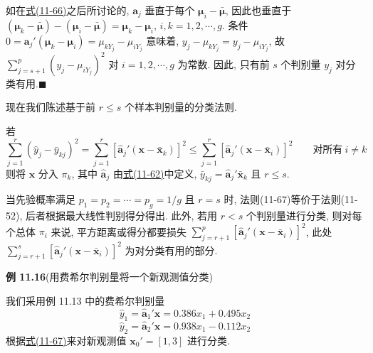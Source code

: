 
如在\hyperref[eq:11-66]{式(11-66)}之后所讨论的, $\mathbf{a}_j$ 垂直于每个 $\boldsymbol{\mu}_i-\bar{\boldsymbol{\mu}}$, 因此也垂直于 $(\boldsymbol{\mu}_k-\bar{\boldsymbol{\mu}})-(\boldsymbol{\mu}_i-\bar{\boldsymbol{\mu}})=\boldsymbol{\mu}_k-\boldsymbol{\mu}_i$, $i,k=1,2,\cdots,g$. 条件 $0=\mathbf{a}_j'(\boldsymbol{\mu}_k-\boldsymbol{\mu}_i)=\mu_{kY_j}-\mu_{iY_j}$ 意味着, $y_j-\mu_{kY_j}=y_j-\mu_{iY_j}$, 故 $\sum\limits_{j=s+1}^{p}(y_j-\mu_{iY_j})^2$ 对 $i=1,2,\cdots,g$ 为常数. 因此, 只有前 $s$ 个判别量 $y_j$ 对分类有用.\hfill$\blacksquare$

现在我们陈述基于前 $r\le s$ 个样本判别量的分类法则.

\begin{mvframe}[基于样本判别量的费希尔分类方法]
若
\label{eq:11-67}
\begin{equation}
\sum_{j=1}^{r}(\hat{y}_j-\bar{y}_{kj})^2=\sum_{j=1}^{r}[\hat{\mathbf{a}}_j'(\mathbf{x}-\bar{\mathbf{x}}_k)]^2\le\sum_{j=1}^{r}[\hat{\mathbf{a}}_j'(\mathbf{x}-\bar{\mathbf{x}}_i)]^2\qquad \text{对所有}\ i\ne k
\tag{11-67}
\end{equation}
则将 $\mathbf{x}$ 分入 $\pi_k$, 其中 $\hat{\mathbf{a}}_j$ 由\hyperref[eq:11-62]{式(11-62)}中定义, $\bar{y}_{kj}=\hat{\mathbf{a}}_j'\bar{\mathbf{x}}_k$ 且 $r\le s$.
\end{mvframe}

当先验概率满足 $p_1=p_2=\cdots=p_g=1/g$ 且 $r=s$ 时, 法则(11-67)等价于法则(11-52), 后者根据最大线性判别得分得出. 此外, 若用 $r<s$ 个判别量进行分类, 则对每个总体 $\pi_i$ 来说, 平方距离或得分都要损失 $\sum\limits_{j=r+1}^{p}[\hat{\mathbf{a}}_j'(\mathbf{x}-\bar{\mathbf{x}}_i)]^2$, 此处 $\sum\limits_{j=r+1}^{s}[\hat{\mathbf{a}}_j'(\mathbf{x}-\bar{\mathbf{x}}_i)]^2$ 为对分类有用的部分.

\noindent\textbf{例 11.16}\quad (用费希尔判别量将一个新观测值分类)

我们采用例 11.13 中的费希尔判别量
\[
\hat{y}_1=\hat{\mathbf{a}}_1'\mathbf{x}=0.386x_1+0.495x_2
\]
\[
\hat{y}_2=\hat{\mathbf{a}}_2'\mathbf{x}=0.938x_1-0.112x_2
\]
根据\hyperref[eq:11-67]{式(11-67)}来对新观测值 $\mathbf{x}_0'=[1,3]$ 进行分类.

